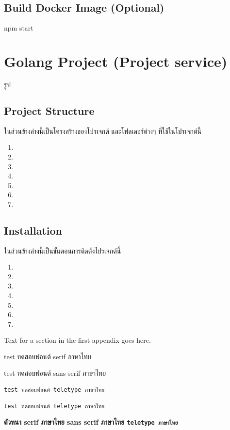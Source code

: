   \subsection{Build Docker Image (Optional)}
    \qquad npm start

\section{Golang Project (Project service)}
  \qquad รูป
  \subsection{Project Structure}
    \qquad ในส่วนข้างล่างนี้เป็นโครงสร้างของโปรเจกต์ และโฟลเดอร์ต่างๆ ที่ใช้ในโปรเจกต์นี้
    \begin{enumerate}
      \item 
      \item 
      \item 
      \item
      \item
      \item
      \item
    \end{enumerate}
  \subsection{Installation}
    \qquad ในส่วนข้างล่างนี้เป็นขั้นตอนการติดตั้งโปรเจกต์นี้
    \begin{enumerate}
      \item 
      \item 
      \item 
      \item
      \item
      \item
      \item
    \end{enumerate}
  





Text for a section in the first appendix goes here.

test ทดสอบฟอนต์ serif ภาษาไทย

\textsf{test ทดสอบฟอนต์ sans serif ภาษาไทย}

\verb+test ทดสอบฟอนต์ teletype ภาษาไทย+

\texttt{test ทดสอบฟอนต์ teletype ภาษาไทย}

\textbf{ตัวหนา serif ภาษาไทย \textsf{sans serif ภาษาไทย} \texttt{teletype ภาษาไทย}}

